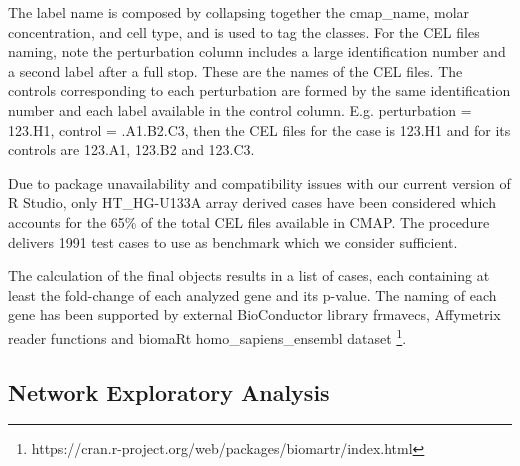 The label name is composed by collapsing together the cmap\_name, molar concentration, and cell type, and is used to tag the classes. For the CEL files naming, note the perturbation column includes a large identification number and a second label after a full stop. These are the names of the CEL files. The controls corresponding to each perturbation are formed by the same identification number and each label available in the control column. E.g. perturbation = 123.H1, control = .A1.B2.C3, then the CEL files for the case is 123.H1 and for its controls are 123.A1, 123.B2 and 123.C3. 

Due to package unavailability and compatibility issues with our current version of R Studio, only HT\_HG-U133A array derived cases have been considered which accounts for the 65\% of the total CEL files available in CMAP. The procedure delivers 1991 test cases to use as benchmark which we consider sufficient.

The calculation of the final objects results in a list of cases, each containing at least the fold-change of each analyzed gene and its p-value. The naming of each gene has been supported by external BioConductor library frmavecs, Affymetrix reader functions and biomaRt homo\_sapiens\_ensembl dataset \footnote{https://cran.r-project.org/web/packages/biomartr/index.html}.
\label{section:suppl:bench}

\subsection{Network Exploratory Analysis}
\label{section:suppl:eda}

